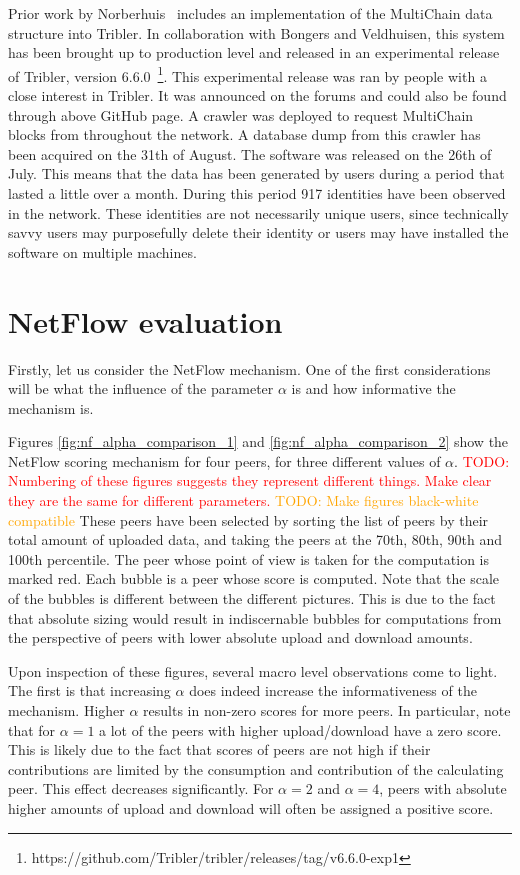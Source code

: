 \documentclass[a4paper,11pt]{book}
\newcommand\musthave[1]{\textcolor{red}{TODO: #1}}
\newcommand\nicetohave[1]{\textcolor{orange}{TODO: #1}}
\theoremstyle{definition}
\begin{document}
Prior work by Norberhuis~\cite{norberhuis2015multichain} includes
an implementation of the MultiChain data structure into Tribler. In collaboration with Bongers and Veldhuisen,
this system has been brought up to production level and released in an experimental release of Tribler,
version 6.6.0~\footnote{https://github.com/Tribler/tribler/releases/tag/v6.6.0-exp1}. This experimental
release was ran by people with a close interest in Tribler. It was announced on the forums and could
also be found through above GitHub page. A crawler was deployed to request MultiChain blocks from throughout
the network. A database dump from this crawler has been acquired on the 31th of August. The software
was released on the 26th of July. This means that the data has been generated by users during a period
that lasted a little over a month. During this period 917 identities have been observed in the network.
These identities are not necessarily unique users, since technically savvy users may purposefully 
delete their identity or users may have installed the software on multiple machines.

\section{NetFlow evaluation}

Firstly, let us consider the NetFlow mechanism. One of the first considerations will be what the influence
of the parameter $\alpha$ is and how informative the mechanism is.

Figures \ref{fig:nf_alpha_comparison_1} and \ref{fig:nf_alpha_comparison_2}
show the NetFlow scoring mechanism for four peers, for three
different values of $\alpha$. 
\musthave{Numbering of these figures suggests they represent different things. Make clear they are the
same for different parameters. } 
\nicetohave{Make figures black-white compatible}
These peers have been selected by sorting the list of peers by their total
amount of uploaded data, and taking the peers at the 70th, 80th, 90th and 100th percentile.
The peer whose point of view is taken for the computation is marked red. Each bubble is a peer whose
score is computed. Note that the scale of the bubbles is different between the different pictures. 
This is due to the fact that absolute sizing would result in indiscernable bubbles for computations
from the perspective of peers with lower absolute upload and download amounts. 

Upon inspection of these figures, several macro level observations come to light. The first
is that increasing $\alpha$ does indeed increase the informativeness of the mechanism.
Higher $\alpha$ results in non-zero scores for more peers. In particular, note that
for $\alpha=1$ a lot of the peers with higher upload/download have a zero score. This is
likely due to the fact that scores of peers are not high if their contributions are limited
by the consumption and contribution of the calculating peer. This effect decreases
significantly. For $\alpha=2$ and $\alpha=4$, peers with absolute higher amounts of upload
and download will often be assigned a positive score. 
\end{document}
